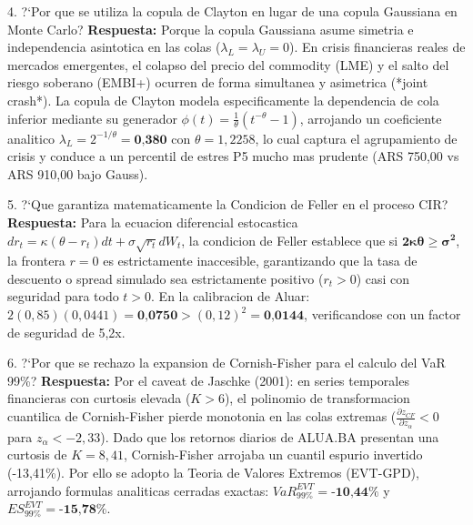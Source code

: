 \documentclass[10pt,a4paper]{article}
\theoremstyle{definition}
\begin{document}
\begin{examquestion}{4. ?`Por que se utiliza la copula de Clayton en lugar de una copula Gaussiana en Monte Carlo?}
\textbf{Respuesta:} Porque la copula Gaussiana asume simetria e independencia asintotica en las colas ($\lambda_L = \lambda_U = 0$). En crisis financieras reales de mercados emergentes, el colapso del precio del commodity (LME) y el salto del riesgo soberano (EMBI+) ocurren de forma simultanea y asimetrica (*joint crash*). La copula de Clayton modela especificamente la dependencia de cola inferior mediante su generador $\phi(t) = \frac{1}{\theta}(t^{-\theta}-1)$, arrojando un coeficiente analitico $\lambda_L = 2^{-1/\theta} = \textbf{0,380}$ con $\theta = 1,2258$, lo cual captura el agrupamiento de crisis y conduce a un percentil de estres P5 mucho mas prudente (ARS 750,00 vs ARS 910,00 bajo Gauss).
\end{examquestion}

\begin{examquestion}{5. ?`Que garantiza matematicamente la Condicion de Feller en el proceso CIR?}
\textbf{Respuesta:} Para la ecuacion diferencial estocastica $dr_t = \kappa(\theta - r_t)dt + \sigma \sqrt{r_t} dW_t$, la condicion de Feller establece que si $\mathbf{2\kappa\theta \ge \sigma^2}$, la frontera $r = 0$ es estrictamente inaccesible, garantizando que la tasa de descuento o spread simulado sea estrictamente positivo ($r_t > 0$) casi con seguridad para todo $t > 0$. En la calibracion de Aluar: $2(0,85)(0,0441) = \textbf{0,0750} > (0,12)^2 = \textbf{0,0144}$, verificandose con un factor de seguridad de 5,2x.
\end{examquestion}

\begin{examquestion}{6. ?`Por que se rechazo la expansion de Cornish-Fisher para el calculo del VaR 99\%?}
\textbf{Respuesta:} Por el caveat de Jaschke (2001): en series temporales financieras con curtosis elevada ($K > 6$), el polinomio de transformacion cuantilica de Cornish-Fisher pierde monotonia en las colas extremas ($\frac{\partial z_{CF}}{\partial z_\alpha} < 0$ para $z_\alpha < -2,33$). Dado que los retornos diarios de ALUA.BA presentan una curtosis de $K = 8,41$, Cornish-Fisher arrojaba un cuantil espurio invertido (-13,41\%). Por ello se adopto la Teoria de Valores Extremos (EVT-GPD), arrojando formulas analiticas cerradas exactas: $VaR_{99\%}^{EVT} = \textbf{-10,44\%}$ y $ES_{99\%}^{EVT} = \textbf{-15,78\%}$.
\end{examquestion}
\end{document}

